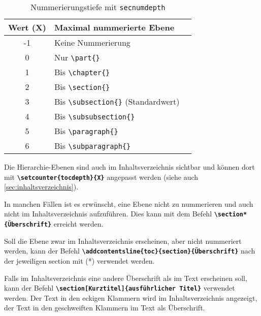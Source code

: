 \begin{table}[H]
    \centering
    \begin{tabular}{cll}
        \toprule
        \textbf{Wert (X)} & \textbf{Maximal nummerierte Ebene}                        \\
        \midrule
        -1                & Keine Nummerierung                                        \\
        0                 & Nur \texttt{\textbackslash part\{\}}                      \\
        1                 & Bis \texttt{\textbackslash chapter\{\}}                   \\
        2                 & Bis \texttt{\textbackslash section\{\}}                   \\
        3                 & Bis \texttt{\textbackslash subsection\{\}} (Standardwert) \\
        4                 & Bis \texttt{\textbackslash subsubsection\{\}}             \\
        5                 & Bis \texttt{\textbackslash paragraph\{\}}                 \\
        6                 & Bis \texttt{\textbackslash subparagraph\{\}}              \\
        \bottomrule
    \end{tabular}
    \caption{Nummerierungstiefe mit \texttt{secnumdepth}}
    \label{tab:secnumdepth}
\end{table}

Die Hierarchie-Ebenen sind auch im Inhaltsverzeichnis sichtbar und können dort mit \textbf{\texttt{\textbackslash setcounter\{tocdepth\}\{X\}}} angepasst werden (siehe auch \ref{sec:inhaltsverzeichnis}).

In manchen Fällen ist es erwünscht, eine Ebene nicht zu nummerieren und auch nicht im Inhaltsverzeichnis aufzuführen. Dies kann mit dem Befehl \textbf{\texttt{\textbackslash section*\{Überschrift\}}} erreicht werden.

Soll die Ebene zwar im Inhaltsverzeichnis erscheinen, aber nicht nummeriert werden, kann der Befehl \textbf{\texttt{\textbackslash addcontentsline\{toc\}\{section\}\{Überschrift\}}} nach der jeweiligen section mit (*) verwendet werden.

Falls im Inhaltsverzeichnis eine andere Überschrift als im Text erscheinen soll, kann der Befehl \textbf{\texttt{\textbackslash section[Kurztitel]\{ausführlicher Titel\}}} verwendet werden. Der Text in den eckigen Klammern wird im Inhaltsverzeichnis angezeigt, der Text in den geschweiften Klammern im Text als Überschrift.

